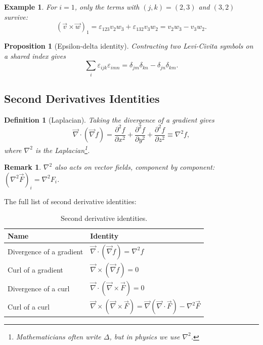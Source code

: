 \documentclass{article}
\newtheorem{definition}{Definition}
\newtheorem*{example}{Example}
\newtheorem{remark}{Remark}
\newtheorem{proposition}{Proposition}
\begin{document}
\begin{example}
    For $i = 1$, only the terms with $(j,k) = (2,3)$ and $(3,2)$ survive:
    \[(\vec{v}\times\vec{w})_1 = \varepsilon_{123}v_2w_3 + \varepsilon_{132}v_3w_2 = v_2w_3 - v_3w_2.\]
\end{example}
\begin{proposition}[Epsilon-delta identity]
    \label{Epsilon-delta-id}
    Contracting two Levi-Civita symbols on a shared index gives
    \[\sum_i \varepsilon_{ijk}\varepsilon_{imn} = \delta_{jm}\delta_{kn} - \delta_{jn}\delta_{km}.\]
\end{proposition}

\subsection{Second Derivatives Identities}
\begin{definition}[Laplacian]
    Taking the divergence of a gradient gives
    \begin{equation}
        \vec{\nabla}\cdot(\vec{\nabla}f) = \frac{\partial^2 f}{\partial x^2} + \frac{\partial^2 f}{\partial y^2} + \frac{\partial^2 f}{\partial z^2} \equiv \nabla^2 f,
    \end{equation}
    where $\nabla^2$ is the Laplacian\footnote{Mathematicians often write $\Delta$, but in physics we use $\nabla^2$.}.
\end{definition}
\begin{remark}
    $\nabla^2$ also acts on vector fields, component by component: $(\nabla^2\vec{F})_i = \nabla^2 F_i$.
\end{remark}
The full list of second derivative identities:
\begin{table}[H]
    \centering
    \renewcommand{\arraystretch}{1.4}
    \begin{tabular}{l|l}
        \toprule
        \textbf{Name} & \textbf{Identity} \\
        \midrule
        Divergence of a gradient & $\vec{\nabla}\cdot(\vec{\nabla}f) = \nabla^2 f$ \\
        Curl of a gradient & $\vec{\nabla}\times(\vec{\nabla}f) = 0$ \\
        Divergence of a curl & $\vec{\nabla}\cdot(\vec{\nabla}\times\vec{F}) = 0$ \\
        Curl of a curl & $\vec{\nabla}\times(\vec{\nabla}\times\vec{F}) = \vec{\nabla}(\vec{\nabla}\cdot\vec{F}) - \nabla^2\vec{F}$ \\
        \bottomrule
    \end{tabular}
    \caption{Second derivative identities.}
\end{table}
\end{document}

